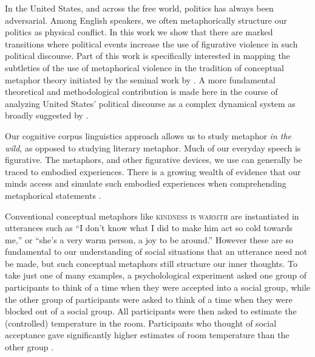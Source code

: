 In the United States, and across the free world, politics has always been
adversarial. Among English speakers, we often metaphorically structure 
our politics as physical conflict. In this work we show that there are marked
transitions where political events increase the use of figurative violence
in such political discourse. Part of this work is specifically interested in
mapping the subtleties of the use of metaphorical violence in the tradition of
conceptual metaphor theory initiated by the seminal work by .
A more fundamental theoretical and methodological contribution is made here
in the course of analyzing United States' political discourse as a 
complex dynamical system as broadly suggested by .

Our cognitive corpus linguistics approach allows us to study metaphor 
\textit{in the wild}, as opposed to studying literary metaphor. Much of 
our everyday speech is figurative. The metaphors, and other figurative 
devices, we use can generally be traced to embodied experiences. There is a
growing wealth of evidence that our minds access and simulate such 
embodied experiences when comprehending metaphorical statements 
\cite{Gibbs2008}. 

Conventional conceptual metaphors like \textsc{kindness is warmth} are instantiated
in utterances such as ``I don't know what I did to make him act so
cold towards me,'' or ``she's a very warm person, a joy to be around.'' However
these are so fundamental to our understanding of social situations that
an utterance need not be made, but such conceptual metaphors still structure
our inner thoughts.
To take just one of many examples, a psycholological 
experiment asked one group of participants to think of a time when they were
accepted into a social group, while the other group of participants were asked
to think of a time when they were blocked out of a social group. 
All participants were then asked to estimate the (controlled) 
temperature in the room.  Participants who thought of social acceptance
gave significantly higher estimates of room temperature than the other group
\cite{Lakoff2014, Zhong2008}.

